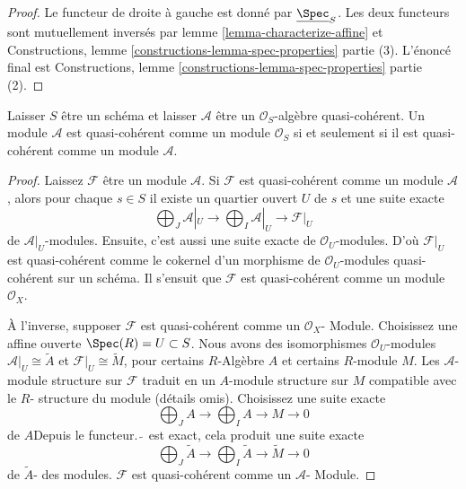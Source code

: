 \begin{proof}
Le functeur de droite à gauche est donné par $\underline{\Spec}_S$. Les deux functeurs sont mutuellement inversés par lemme \ref{lemma-characterize-affine} et Constructions, lemme \ref{constructions-lemma-spec-properties} partie (3). L'énoncé final est Constructions, lemme \ref{constructions-lemma-spec-properties} partie (2).
\end{proof}

\begin{lemma}

\label{lemma-quasi-coherence-scalar-restriction}

\begin{reference}
\cite[I, proposition 9.6.1]{EGA}
\end{reference}
Laisser $S$ être un schéma et laisser $\mathcal{A}$ être un $\mathcal{O}_S$-algèbre quasi-cohérent. Un module $\mathcal{A}$ est quasi-cohérent comme un module $\mathcal{O}_S$ si et seulement si il est quasi-cohérent comme un module $\mathcal{A}$.
\end{lemma}

\begin{proof}
Laissez $\mathcal{F}$ être un module $\mathcal{A}$. Si $\mathcal{F}$ est quasi-cohérent comme un module $\mathcal{A}$, alors pour chaque $s \in S$ il existe un quartier ouvert $U$ de $s$ et une suite exacte $$
\bigoplus\nolimits_J\mathcal{A}|_U\to
\bigoplus\nolimits_I\mathcal{A}|_U\to
\mathcal{F}|_U
$$ de $\mathcal{A}|_U$-modules. Ensuite, c'est aussi une suite exacte de $\mathcal{O}_U$-modules. D'où $\mathcal{F}|_U$ est quasi-cohérent comme le cokernel d'un morphisme de $\mathcal{O}_U$-modules quasi-cohérent sur un schéma. Il s'ensuit que $\mathcal{F}$ est quasi-cohérent comme un module $\mathcal{O}_X$.

\medskip\noindent

À l'inverse, supposer $\mathcal{F}$ est quasi-cohérent comme un $\mathcal{O}_X$- Module. Choisissez une affine ouverte $\Spec(R) = U \subset S$. Nous avons des isomorphismes
$\mathcal{O}_U$-modules $\mathcal{A}|_U \cong \widetilde{A}$ et
$\mathcal{F}|_U \cong \widetilde{M}$, pour certains $R$-Algèbre $A$
et certains $R$-module $M$. Les $\mathcal{A}$-module structure sur $\mathcal{F}$
traduit en un $A$-module structure sur $M$ compatible avec le $R$- structure du module (détails omis). Choisissez une suite exacte
$$
\bigoplus\nolimits_J A \to
\bigoplus\nolimits_I A \to
M \to 0
$$
de $A$Depuis le functeur. $\widetilde{\ }$ est exact, cela produit une suite exacte
$$
\bigoplus\nolimits_J \widetilde{A}\to
\bigoplus\nolimits_I \widetilde{A}\to
\widetilde{M} \to 0
$$
de $\widetilde{A}$- des modules.
$\mathcal{F}$ est quasi-cohérent comme un $\mathcal{A}$- Module.

\end{proof}

